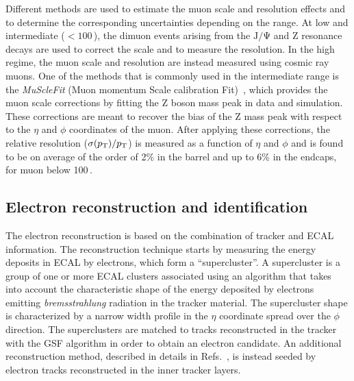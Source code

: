 Different methods are used to estimate the muon \pt scale and resolution effects and to determine the corresponding uncertainties depending on the \pt range. At low and intermediate \pt ($< 100$\,\GeV), the dimuon events arising from the $\mathrm{J/\Psi}$ and Z resonance decays are used to correct the \pt scale and to measure the \pt resolution. In the high \pt regime, the muon \pt scale and resolution are instead measured using cosmic ray muons. One of the methods that is commonly used in the intermediate \pt range is the \emph{MuScleFit} (Muon momentum Scale calibration Fit)~\cite{Chatrchyan:2012xi}, which provides the muon \pt scale corrections by fitting the Z boson mass peak in data and simulation. These corrections are meant to recover the bias of the Z mass peak with respect to the $\eta$ and $\phi$ coordinates of the muon. After applying these corrections, the relative \pt resolution ($\sigma(p_\mathrm{T})/p_\mathrm{T}$) is measured as a function of $\eta$ and $\phi$ and is found to be on average of the order of 2\% in the barrel and up to 6\% in the endcaps, for muon \pt below 100\,\GeV.

\subsection{Electron reconstruction and identification}\label{sec:eleIdIso}

The electron reconstruction is based on the combination of tracker and ECAL information. The reconstruction technique starts by measuring the energy deposits in ECAL by electrons, which form a ``supercluster''. A supercluster is a group of one or more ECAL clusters associated using an algorithm that takes into account the characteristic shape of the energy deposited by electrons emitting \emph{bremsstrahlung} radiation in the tracker material. The supercluster shape is characterized by a narrow width profile in the $\eta$ coordinate spread over the $\phi$ direction. The superclusters are matched to tracks reconstructed in the tracker with the GSF algorithm in order to obtain an electron candidate. An additional reconstruction method, described in details in Refs.~\cite{CMS-PAS-EGM-10-004,Khachatryan:2015hwa}, is instead seeded by electron tracks reconstructed in the inner tracker layers.


